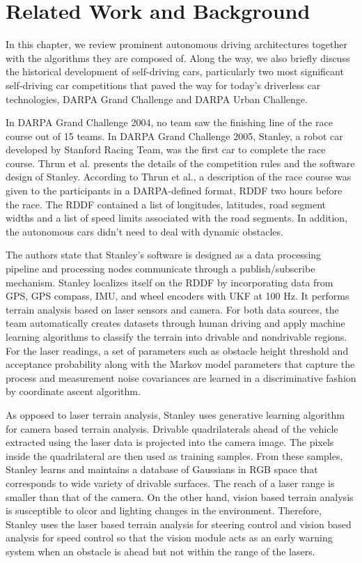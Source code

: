 \chapter{Related Work and Background}
\label{chp:b2}

In this chapter, we review prominent autonomous driving architectures together
with the algorithms they are composed of. Along the way, we also briefly
discuss the historical development of self-driving cars, particularly two most
significant self-driving car competitions that paved the way for today's
driverless car technologies, DARPA Grand Challenge and DARPA Urban Challenge.

In DARPA Grand Challenge 2004, no team saw the finishing line of the race
course out of 15 teams. In DARPA Grand Challenge 2005, Stanley, a robot car
developed by Stanford Racing Team, was the first car to complete the race
course.  Thrun et al. \cite{Thrun2006StanleyTR} presents the details of the
competition rules and the software design of Stanley. According to Thrun et
al., a description of the race course was given to the participants in a
DARPA-defined format, RDDF two hours before the race. The RDDF contained a list
of longitudes, latitudes, road segment widths and a list of speed limits
associated with the road segments. In addition, the autonomous cars didn't need
to deal with dynamic obstacles.

The authors state that Stanley's software is designed as a data processing
pipeline and processing nodes communicate through a publish/subscribe
mechanism. Stanley localizes itself on the RDDF by incorporating data from GPS,
GPS compass, IMU, and wheel encoders with UKF at 100 Hz. It performs terrain
analysis based on laser sensors and camera. For both data sources, the team
automatically creates datasets through human driving and apply machine learning
algorithms to classify the terrain into drivable and nondrivable regions. For
the laser readings, a set of parameters such as obstacle height threshold and
acceptance probability along with the Markov model parameters that capture the
process and measurement noise covariances are learned in a discriminative
fashion by coordinate ascent algorithm.

As opposed to laser terrain analysis, Stanley uses generative learning
algorithm for camera based terrain analysis. Drivable quadrilaterals ahead of
the vehicle extracted using the laser data is projected into the camera image.
The pixels inside the quadrilateral are then used as training samples. From
these samples, Stanley learns and maintains a database of Gaussians in RGB
space that corresponds to wide variety of drivable surfaces. The reach of a
laser range is smaller than that of the camera. On the other hand, vision based
terrain analysis is susceptible to olcor and lighting changes in the
environment.  Therefore, Stanley uses the laser based terrain analysis for
steering control and vision based analysis for speed control so that the vision
module acts as an early warning system when an obstacle is ahead but not within
the range of the lasers.

